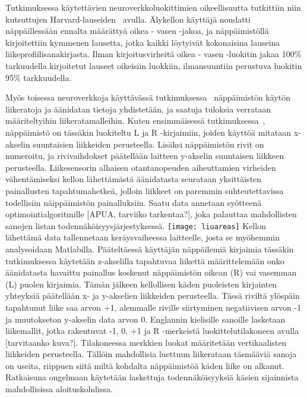 \documentclass[finnish]{tktltiki2}
\theoremstyle{definition}
\theoremstyle{remark}
\begin{document}
Tutkimuksessa käytettävien neuroverkkoluokittimien oikeellisuutta tutkittiin niin kutsuttujen Harvard-lauseiden~\cite{har} avulla. Älykellon käyttäjä noudatti näppäillessään ennalta määrättyä oikea - vasen -jakoa, ja näppäimistöllä kirjoitettiin kymmenen lausetta, jotka kaikki löytyivät kokonaisina lauseina liikeprofiilisanakirjasta. Ilman kirjoitusvirheitä oikea - vasen -luokitin jakaa 100\% tarkuudella kirjoitetut lauseet oikeisiin luokkiin, ilmansuuntiin perustuva luokitin 95\% tarkkuudella. 

Myös toisessa neuroverkkoja käyttävässä tutkimuksessa~\cite{liu} näppäimistön käytön liikeratoja ja äänidatan tietoja yhdistetään, ja saatuja tuloksia verrataan määriteltyihin liikeratamalleihin. Kuten ensimmäisessä tutkimuksessa~\cite{maiti}, näppäimistö on tässäkin luokiteltu L ja R -kirjaimiin, joiden käyttöä mitataan x-akselin suuntaisien liikkeiden perusteella. Lisäksi näppäimistön rivit on numeroitu, ja rivivaihdokset päätellään laitteen y-akselin suuntaisen liikkeen perusteella. Liikesensorin alhaisen otantanopeuden aiheuttamien virheiden vähentämiseksi kellon lähettämästä äänidatasta seurataan yksittäisten painallusten tapahtumahetkeä, jolloin liikkeet on paremmin suhteutettavissa todellisiin näippäimistön painalluksiin. Saatu data annetaan syötteenä optimointialgoritmille [APUA, tarviiko tarkentaa?], joka palauttaa mahdollisten sanojen listan todennäköisyysjärjestyksessä. 
\linebreak
\texttt{[image: liuareas]}
\linebreak
Kellon lähettämä data tallennetaan keräysvaiheessa laitteelle, josta se myöhemmin analysoidaan Matlabilla. Pääteltäessä käyttäjän näppäilemiä kirjaimia tässäkin tutkimuksessa käytetään z-akselilla tapahtuvaa liikettä määrittelemään onko äänidatasta havaittu painallus koskenut näppäimistön oikean (R) vai vasemman (L) puolen kirjaimia. Tämän jälkeen kellollisen käden puoleisten kirjainten yhteyksiä päätellään x- ja y-akselien liikkeiden perusteella. Tässä riviltä ylöspäin tapahtunut liike saa arvon +1, alemmalle riville siirtyminen negatiivisen arvon -1 ja muutokseton y-akselin data arvon 0. Englannin kielisille sanoille lasketaan liikemallit, jotka rakentuvat -1, 0, +1 ja R -merkeistä luokittelutilakoneen avulla [tarvitaanko kuva?]. Tilakoneessa merkkien luokat määritetään vertikaalisten liikkeiden perusteella. Tällöin mahdollisia luettuun liikerataan täsmääviä sanoja on useita, riippuen siitä miltä kohdalta näppäimistöä käden liike on alkanut. Ratkaisuna ongelmaan käytetään laskettuja todennäköisyyksiä käsien sijainnista mahdollisissa aloituskohdissa.
\end{document}
